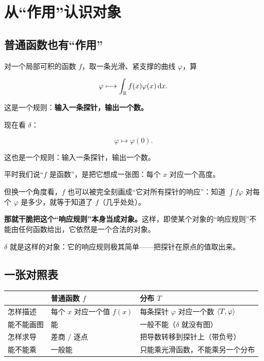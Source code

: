 \section{从“作用”认识对象}

\subsection{普通函数也有“作用”}

对一个局部可积的函数 $f$，取一条光滑、紧支撑的曲线 $\varphi$，算

\begin{equation}
\varphi\longmapsto\int_{\mathbb{R}}f(x)\varphi(x)\mathop{}\!\mathrm{d} x .
\end{equation}

这是一个规则：\textbf{输入一条探针，输出一个数。}

现在看 $\delta$：

\begin{equation}
\varphi\longmapsto\varphi(0).
\end{equation}

这也是一个规则：输入一条探针，输出一个数。

\begin{ideabox}[关键的一步观念转换]
平时我们说“$f$ 是函数”，是把它想成一张图：每个 $x$ 对应一个高度。

但换一个角度看，$f$ 也可以被完全刻画成“它对所有探针的响应”：知道 $\int f\varphi$ 对每个 $\varphi$ 是多少，就等于知道了 $f$（几乎处处）。

\textbf{那就干脆把这个“响应规则”本身当成对象。}这样，即使某个对象的“响应规则”不能由任何函数给出，它依然是一个合法的对象。

$\delta$ 就是这样的对象：它的响应规则极其简单——把探针在原点的值取出来。
\end{ideabox}

\subsection{一张对照表}

\begin{center}
\small
\renewcommand{\arraystretch}{1.55}
\begin{tabularx}{\textwidth}{@{}L{3.4cm}L{4.6cm}Y@{}}
\toprule
 & 普通函数 $f$ & 分布 $T$ \\
\midrule
怎样描述 & 每个 $x$ 对应一个值 $f(x)$ & 每条探针 $\varphi$ 对应一个数 $\langle T,\varphi\rangle$ \\
能不能画图 & 能 & 一般不能（$\delta$ 就没有图） \\
怎样求导 & 差商 / 逐点 & 把导数转移到探针上（带负号） \\
能不能乘 & 一般能 & 只能乘光滑函数，不能乘另一个分布 \\
\bottomrule
\end{tabularx}
\end{center}

